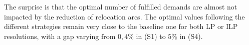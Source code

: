 \begin{bibunit}[ieeetr]
\bigskip
The surprise is that the optimal number of fulfilled demands are almost not impacted by the reduction of relocation arcs.
The optimal values following  the different strategies remain very close to the baseline one for both LP or ILP resolutions,
with a gap varying from $0,4$\% in (S1) to $5$\% in (S4).

\newpage
{}
\renewcommand{\bibname}{Bibliography of chapter \thechapter}
\end{bibunit}
